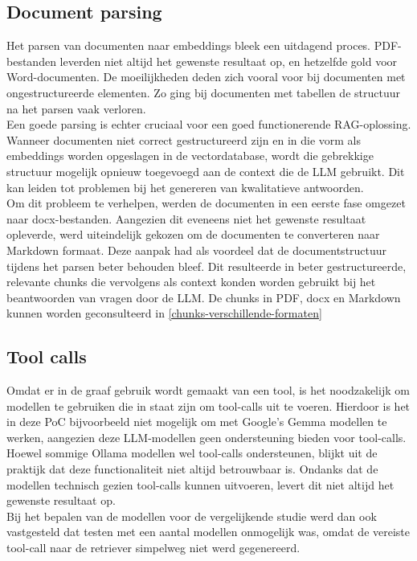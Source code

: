 \subsection{Document parsing}
Het parsen van documenten naar embeddings bleek een uitdagend proces. PDF-bestanden leverden niet altijd het gewenste resultaat op, en hetzelfde gold voor Word-documenten. De moeilijkheden deden zich vooral voor bij documenten met ongestructureerde elementen. Zo ging bij documenten met tabellen de structuur na het parsen vaak verloren.
\\[1em]
Een goede parsing is echter cruciaal voor een goed functionerende RAG-oplossing. Wanneer documenten niet correct gestructureerd zijn en in die vorm als embeddings worden opgeslagen in de vectordatabase, wordt die gebrekkige structuur mogelijk opnieuw toegevoegd aan de context die de LLM gebruikt. Dit kan leiden tot problemen bij het genereren van kwalitatieve antwoorden.
\\[1em]
Om dit probleem te verhelpen, werden de documenten in een eerste fase omgezet naar docx-bestanden. Aangezien dit eveneens niet het gewenste resultaat opleverde, werd uiteindelijk gekozen om de documenten te converteren naar Markdown formaat. Deze aanpak had als voordeel dat de documentstructuur tijdens het parsen beter behouden bleef. Dit resulteerde in beter gestructureerde, relevante chunks die vervolgens als context konden worden gebruikt bij het beantwoorden van vragen door de LLM. De chunks in PDF, docx en Markdown kunnen worden geconsulteerd in \ref{chunks-verschillende-formaten}



\subsection{Tool calls}
\label{tool-calls}

Omdat er in de graaf gebruik wordt gemaakt van een tool, is het noodzakelijk om modellen te gebruiken die in staat zijn om tool-calls uit te voeren. Hierdoor is het in deze PoC bijvoorbeeld niet mogelijk om met Google's Gemma modellen te werken, aangezien deze LLM-modellen geen ondersteuning bieden voor tool-calls.
\\[1em]
Hoewel sommige Ollama modellen wel tool-calls ondersteunen, blijkt uit de praktijk dat deze functionaliteit niet altijd betrouwbaar is. Ondanks dat de modellen technisch gezien tool-calls kunnen uitvoeren, levert dit niet altijd het gewenste resultaat op.
\\[1em]
Bij het bepalen van de modellen voor de vergelijkende studie werd dan ook vastgesteld dat testen met een aantal modellen onmogelijk was, omdat de vereiste tool-call naar de retriever simpelweg niet werd gegenereerd. 


